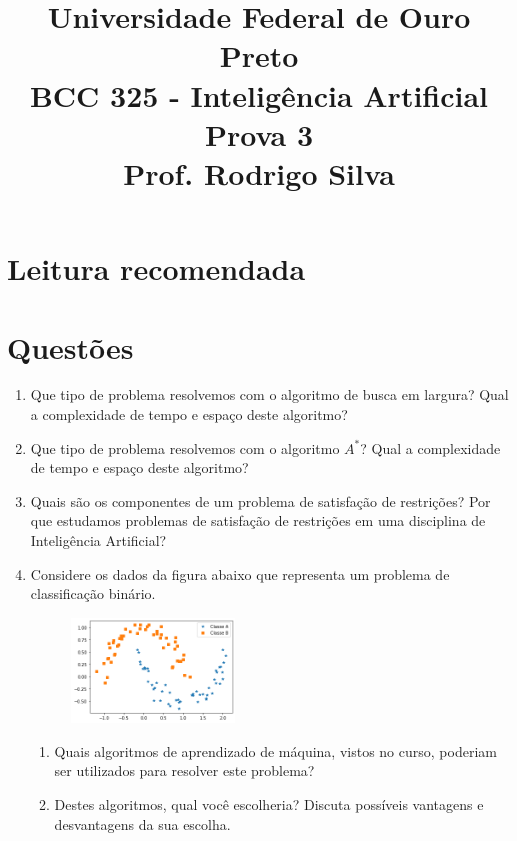 \documentclass{article}
\title{\vspace{-2 cm} Universidade Federal de Ouro Preto \\ BCC 325 - Inteligência Artificial \\ Prova 3 \\ Prof. Rodrigo Silva}
\date{}
\begin{document}
\maketitle

\section{Leitura recomendada}



\section{Questões}

\begin{enumerate}

    \item Que tipo de problema resolvemos com o algoritmo de busca em largura? Qual a complexidade de tempo e espaço deste algoritmo?
    
    \item Que tipo de problema resolvemos com o algoritmo $A^*$? Qual a complexidade de tempo e espaço deste algoritmo?
    
    \item Quais são os componentes de um problema de satisfação de restrições? Por que estudamos problemas de satisfação de restrições em uma disciplina de Inteligência Artificial?
    
    \item Considere os dados da figura abaixo que representa um problema de classificação binário. 
    
        \begin{figure}[!ht]
            \centering
            \includegraphics[width=0.41\textwidth]{moons.png}
        \end{figure}
        
        \begin{enumerate}
            \item Quais algoritmos de aprendizado de máquina, vistos no curso, poderiam ser utilizados para resolver este problema?
            \item Destes algoritmos, qual você escolheria? Discuta possíveis vantagens e desvantagens da sua escolha.
        \end{enumerate}


\end{enumerate}
\end{document}
